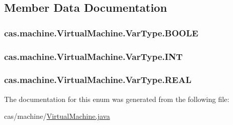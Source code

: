 \subsection{Member Data Documentation}
\hypertarget{enumcas_1_1machine_1_1_virtual_machine_1_1_var_type_a14d1551cc662f8f41c5d8756391cbc27}{
\subsubsection[{B\-O\-O\-L\-E}]{\setlength{\rightskip}{0pt plus 5cm}cas.\-machine.\-Virtual\-Machine.\-Var\-Type.\-B\-O\-O\-L\-E}}\label{enumcas_1_1machine_1_1_virtual_machine_1_1_var_type_a14d1551cc662f8f41c5d8756391cbc27}
\hypertarget{enumcas_1_1machine_1_1_virtual_machine_1_1_var_type_a5d8d3d6bae08973794306dc86eaa60e4}{
\subsubsection[{I\-N\-T}]{\setlength{\rightskip}{0pt plus 5cm}cas.\-machine.\-Virtual\-Machine.\-Var\-Type.\-I\-N\-T}}\label{enumcas_1_1machine_1_1_virtual_machine_1_1_var_type_a5d8d3d6bae08973794306dc86eaa60e4}
\hypertarget{enumcas_1_1machine_1_1_virtual_machine_1_1_var_type_a31daa7c97eb5e17ff6d88702c2022739}{
\subsubsection[{R\-E\-A\-L}]{\setlength{\rightskip}{0pt plus 5cm}cas.\-machine.\-Virtual\-Machine.\-Var\-Type.\-R\-E\-A\-L}}\label{enumcas_1_1machine_1_1_virtual_machine_1_1_var_type_a31daa7c97eb5e17ff6d88702c2022739}


The documentation for this enum was generated from the following file\-:\begin{DoxyCompactItemize}
\item 
cas/machine/\hyperlink{_virtual_machine_8java}{Virtual\-Machine.\-java}\end{DoxyCompactItemize}
